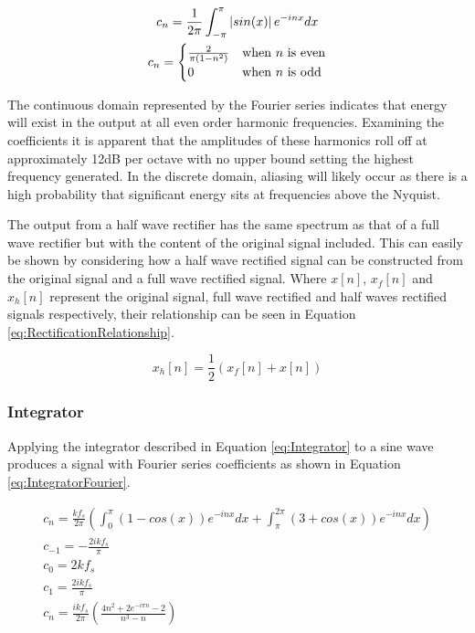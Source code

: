 			\begin{gather}
				c_{n} = \frac{1}{2\pi} \int_{-\pi}^{\pi} \left|sin(x)\right|e^{-inx} dx \nonumber \\
				c_{n} = \begin{cases}
					\frac{2}{\pi(1 - n^{2})} & \text{when $n$ is even} \\
					0 & \text{when $n$ is odd}
				\end{cases}
				\label{eq:RectificationFourier}
			\end{gather}

			The continuous domain represented by the Fourier series indicates that energy will exist in the
			output at all even order harmonic frequencies. Examining the coefficients it is apparent that the
			amplitudes of these harmonics roll off at approximately 12dB per octave with no upper bound setting
			the highest frequency generated. In the discrete domain, aliasing will likely occur as there is a
			high probability that significant energy sits at frequencies above the Nyquist.

			The output from a half wave rectifier has the same spectrum as that of a full wave rectifier but
			with the content of the original signal included. This can easily be shown by considering how a
			half wave rectified signal can be constructed from the original signal and a full wave rectified
			signal.  Where $x[n]$, $x_{f}[n]$ and $x_{h}[n]$ represent the original signal, full wave rectified
			and half waves rectified signals respectively, their relationship can be seen in Equation
			\ref{eq:RectificationRelationship}.

			\begin{equation}
				x_{h}[n] = \frac{1}{2} \left( x_{f}[n] + x[n] \right)
				\label{eq:RectificationRelationship}
			\end{equation}

		\subsubsection*{Integrator}
			Applying the integrator described in Equation \ref{eq:Integrator} to a sine wave produces a signal
			with Fourier series coefficients as shown in Equation \ref{eq:IntegratorFourier}.

			\begin{gather}
				c_{n} = \frac{kf_{s}}{2\pi} \left( \int_{0}^{\pi} (1 - cos(x))e^{-inx} dx +
							\int_{\pi}^{2\pi} (3 + cos(x))e^{-inx} dx \right) \nonumber \\
				c_{-1} = - \frac{2ikf_{s}}{\pi} \nonumber \\
				c_{0} = 2kf_{s} \nonumber \\
				c_{1} = \frac{2ikf_{s}}{\pi} \nonumber \\
				c_{n} = \frac{ikf_{s}}{2\pi} \left( \frac{4n^{2} + 2e^{-i\pi n} - 2}{n^{3} - n} \right)
				\label{eq:IntegratorFourier}
			\end{gather}

